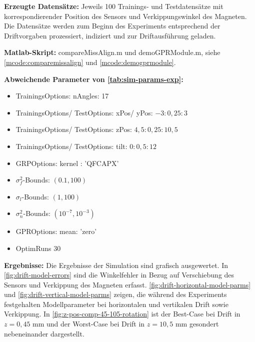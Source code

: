 \clearpage


\textbf{Erzeugte Datensätze:} Jeweils 100 Trainings- und Testdatensätze mit korrespondierender Position des Sensors und Verkippungswinkel des Magneten. Die Datensätze werden zum Beginn des Experiments entsprechend der Driftvorgaben prozessiert, indiziert und zur Driftausführung geladen.

\textbf{Matlab-Skript:} compareMissAlign.m und demoGPRModule.m, siehe \autoref{mcode:comparemissalign} und \autoref{mcode:demogprmodule}.

\textbf{Abweichende Parameter von \autoref{tab:sim-params-exp}:}

\begin{itemize}
	\item TrainingsOptions: nAngles: 17
	\item TrainingsOptions/ TestOptions: xPos/ yPos: $-3:0,25:3$
	\item TrainingsOptions/ TestOptions: zPos: $4,5:0,25:10,5$
	\item TrainingsOptions/ TestOptions: tilt: $0:0,5:12$
	\item GRPOptions: kernel : 'QFCAPX'
	\item $\sigma_f^2$-Bounds: $(0.1,100)$
	\item $\sigma_l$-Bounds: $(1,100)$
	\item $\sigma_n^2$-Bounds: $(10^{-7},10^{-3})$
	\item GPROptions: mean: 'zero'
	\item OptimRuns 30
\end{itemize}

\textbf{Ergebnisse:} Die Ergebnisse der Simulation sind grafisch ausgewertet. In \autoref{fig:drift-model-errors} sind die Winkelfehler in Bezug auf Verschiebung des Sensors und Verkippung des Magneten erfasst.
\autoref{fig:drift-horizontal-model-parms} und \autoref{fig:drift-vertical-model-parms} zeigen, die während des Experiments festgehalten Modellparameter bei horizontalen und vertikalen Drift sowie Verkippung. In \autoref{fig:z-pos-comp-45-105-rotation} ist der Best-Case bei Drift in $z = 0,45$ mm und der Worst-Case bei Drift in $z = 10,5$ mm gesondert nebeneinander dargestellt.


\clearpage


